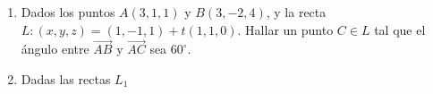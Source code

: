 \documentclass[a4paper]{article}
\begin{document}
\begin{enumerate}
\begin{enumerate} [label=(\alph*)]
		\item Dados los puntos $A(3,1,1)$ y $B(3,-2,4)$, y la recta $L: (x,y,z)=(1,-1,1)+t(1,1,0)$. Hallar un punto $C\in L$ tal que el ángulo entre $\overrightarrow{AB}$ y $\overrightarrow{AC}$ sea $60^{\circ}$.
		
		\item Dadas las rectas $L_1$

	\end{enumerate}

\end{enumerate}
\end{document}
